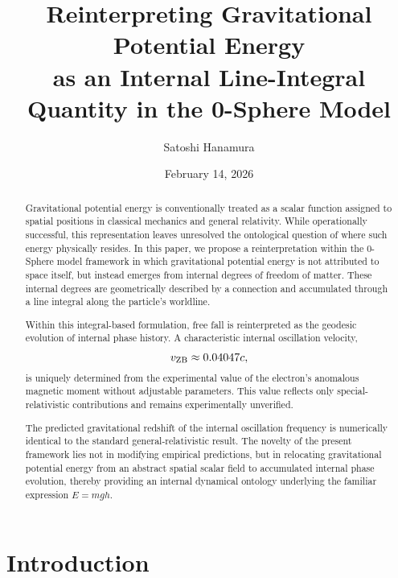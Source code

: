 \documentclass[%
 reprint,
 amsmath,amssymb,
 aps,
 prb,
]{revtex4-2}
\numberwithin{equation}{section}
\begin{document}
\title{Reinterpreting Gravitational Potential Energy \\as an Internal Line-Integral Quantity in the 0-Sphere Model}
\author{Satoshi Hanamura}
\date{February 14, 2026}

\begin{abstract}
Gravitational potential energy is conventionally treated as a scalar function assigned to spatial positions in classical mechanics and general relativity. While operationally successful, this representation leaves unresolved the ontological question of where such energy physically resides. In this paper, we propose a reinterpretation within the 0-Sphere model framework in which gravitational potential energy is not attributed to space itself, but instead emerges from internal degrees of freedom of matter. These internal degrees are geometrically described by a connection and accumulated through a line integral along the particle's worldline.

Within this integral-based formulation, free fall is reinterpreted as the geodesic evolution of internal phase history. A characteristic internal oscillation velocity,
\[
v_{\rm ZB} \approx 0.04047c,
\]
is uniquely determined from the experimental value of the electron's anomalous magnetic moment without adjustable parameters. This value reflects only special-relativistic contributions and remains experimentally unverified.

The predicted gravitational redshift of the internal oscillation frequency is numerically identical to the standard general-relativistic result. The novelty of the present framework lies not in modifying empirical predictions, but in relocating gravitational potential energy from an abstract spatial scalar field to accumulated internal phase evolution, thereby providing an internal dynamical ontology underlying the familiar expression $E = mgh$.
\end{abstract}


\maketitle

\section{Introduction}
\end{document}
